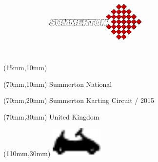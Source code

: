 \null\newpage
\begin{textblock*}{50mm}(15mm,10mm)%
\includegraphics[width=50mm]{LG/SUM.png}
\end{textblock*}
\begin{textblock*}{130mm}(70mm,10mm)%
{\fontsize{20}{20}\selectfont Summerton National}\\
\end{textblock*}
\begin{textblock*}{120mm}(70mm,20mm)%
{\fontsize{16}{16}\selectfont Summerton Karting Circuit / 2015}\\
\end{textblock*}
\begin{textblock*}{120mm}(70mm,30mm)%
{\fontsize{12}{12}\selectfont United Kingdom}
\end{textblock*}
\begin{textblock*}{30mm}(110mm,30mm)%
\centering
\includegraphics[height=15mm]{icons/kart.pdf}
\end{textblock*}
